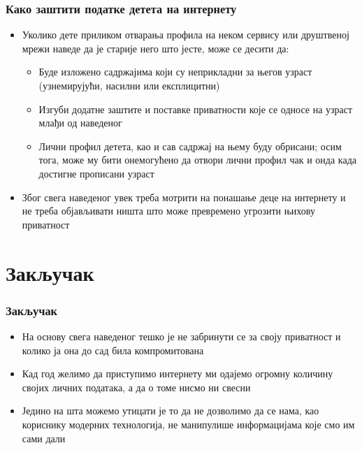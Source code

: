 \documentclass{beamer}
\begin{document}
\begin{frame}[fragile]\frametitle{Како заштити податке детета на интернету}
	
\begin{itemize}
	\item Уколико дете приликом отварања профила на неком сервису или друштвеној мрежи наведе да је старије него што јесте, може се десити да:
	\begin{itemize}
		\item Буде изложено садржајима који су неприкладни за његов узраст (узнемирујући, насилни или експлицитни)
		\item Изгуби додатне заштите и поставке приватности које се односе на узраст млађи од наведеног
		\item Лични профил детета, као и сав садржај на њему буду обрисани; осим тога, може му бити онемогућено да отвори лични профил чак и онда када достигне прописани узраст
\end{itemize}
	\item Због свега наведеног увек треба мотрити на понашање деце на интернету и не треба објављивати ништа што може превремено угрозити њихову приватност	
	\end{itemize}
	
\end{frame}


\section{Закључак}

\begin{frame}[fragile]\frametitle{Закључак}
	\begin{itemize}	
		\item На основу свега наведеног тешко је не забринути се за своју приватност и колико ја она до сад била компромитована
		\item Кад год желимо да приступимо интернету ми одајемо огромну количину својих личних података, а да о томе нисмо ни свесни
		\item Једино на шта можемо утицати је то да не дозволимо да се нама, као кориснику модерних технологија, не манипулише информацијама које смо им сами дали
	\end{itemize}
	
\end{frame}

\subsubsection{}
\end{document}
